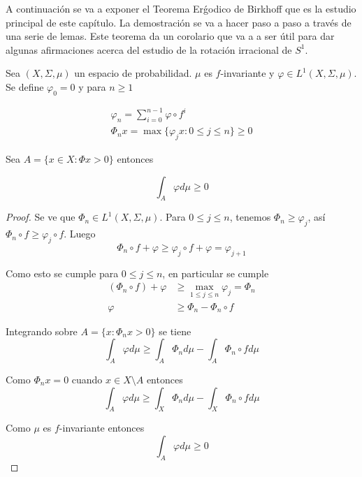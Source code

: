 A continuación se va a exponer el Teorema Erǵodico de Birkhoff que es la estudio principal de este capítulo. La demostración se va a hacer paso a paso a través de una serie de lemas. Este teorema da un corolario que va a a ser útil para dar algunas afirmaciones acerca del estudio de la rotación irracional de $S^1$.

\begin{lema}\label{maxima_desigualdad}
	Sea $(X,\Sigma,\mu)$ un espacio de probabilidad. $\mu$ es $f$-invariante y $\varphi \in L^1(X,\Sigma,\mu)$. Se define $\varphi_0 = 0$ y para $n \geq 1$
	
	\begin{gather}
		\varphi_n = \sum_{i=0}^{n-1} \varphi \circ f^i\\
		\varPhi_n x = \max \{\varphi_j x : 0 \leq j \leq n\} \geq 0
	\end{gather}
	
	Sea $A = \{x \in X: \varPhi x > 0 \}$ entonces

	\begin{equation}
		\int_A \varphi d\mu \geq 0
	\end{equation}
\end{lema}

\begin{proof}
	Se ve que $\varPhi_n \in L^1(X,\Sigma,\mu)$. Para $0 \leq j \leq n$, tenemos $\varPhi_n \geq \varphi_j$, así $\varPhi_n \circ f \geq \varphi_j \circ f$. Luego
	\begin{equation}
		\varPhi_n \circ f + \varphi \geq \varphi_j \circ f + \varphi = \varphi_{j+1}
	\end{equation}
	
	Como esto se cumple para $0 \leq j \leq n$, en particular se cumple
	\begin{align}
		(\varPhi_n \circ f)  + \varphi  &\geq \max_{1 \leq j \leq n} \varphi_j  = \varPhi_n\\
		\varphi &\geq \varPhi_n - \varPhi_n \circ f 
	\end{align}
	
	Integrando sobre $A= \{x: \varPhi_n x > 0\}$ se tiene
	\begin{equation}
		\int_A \varphi d\mu \geq \int_A \varPhi_n d\mu - \int_A \varPhi_n \circ f d\mu
	\end{equation}
	
	Como $\varPhi_n x = 0$ cuando $x \in X \setminus A$ entonces
	\begin{equation}
		\int_A \varphi d\mu \geq \int_X \varPhi_n d\mu - \int_X \varPhi_n \circ f d\mu
	\end{equation}
	
	Como $\mu$ es $f$-invariante entonces
	\begin{equation}
		\int_A \varphi d\mu \geq 0
	\end{equation}
\end{proof}

